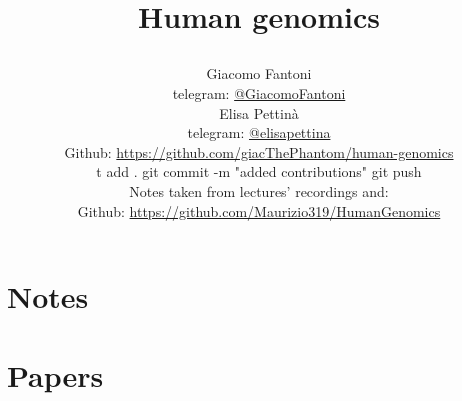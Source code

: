 

\title{\Huge\textbf{{Human genomics}}

\author{
  Giacomo Fantoni \\
  \small telegram: \href{https://t.me/GiacomoFantoni}{@GiacomoFantoni} \\[3pt]
  Elisa Pettin\`a \\
  \small telegram: \href{https://t.me/elisapettina}{@elisapettina} \\[3pt]
\small Github: \href{https://github.com/giacThePhantom/human-genomics}{https://github.com/giacThePhantom/human-genomics}\\t add .
git commit -m "added contributions"
git push

  Notes taken from lectures' recordings and:\\
\small Github: \href{https://github.com/Maurizio319/HumanGenomics}{https://github.com/Maurizio319/HumanGenomics}
}
}


\maketitle
\tableofcontents

  \part{Notes}
    
   
    
    
    
    
    
    
   
    



  \part{Papers}
    
    
   
    
   
    
   


